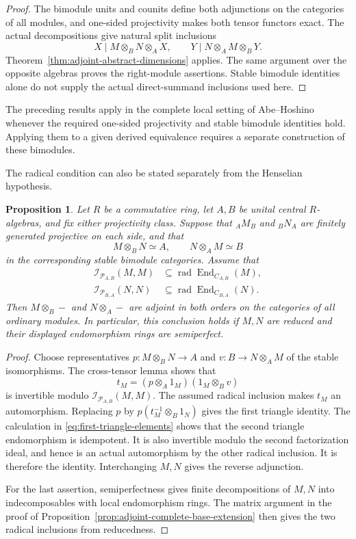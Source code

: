 \documentclass[12pt,a4paper,english,reqno]{amsart}
\numberwithin{equation}{section}
\theoremstyle{plain}
\newtheorem{proposition}[theorem]{Proposition}
\theoremstyle{definition}
\begin{document}
\begin{proof}
The bimodule units and counits define both adjunctions on the
categories of all modules, and one-sided projectivity makes both
tensor functors exact.  The actual decompositions give natural
split inclusions
\[
 X\mid M\otimes_BN\otimes_AX,
 \qquad Y\mid N\otimes_AM\otimes_BY.
\]
Theorem~\ref{thm:adjoint-abstract-dimensions} applies.  The same
argument over the opposite algebras proves the right-module
assertions.  Stable bimodule identities alone do not supply the
actual direct-summand inclusions used here.
\end{proof}

The preceding results apply in the complete local setting of
Abe--Hoshino \cite{AbeHoshino2007} whenever the required one-sided
projectivity and stable bimodule identities hold.  Applying them to
a given derived equivalence requires a separate construction of
these bimodules.

The radical condition can also be stated separately from the
Henselian hypothesis.

\begin{proposition}
\label{prop:adjoint-radical-criterion}
Let $R$ be a commutative ring, let $A,B$ be unital central
$R$-algebras, and fix either projectivity class.  Suppose that
${}_AM_B$ and ${}_BN_A$ are finitely generated projective on each
side, and that
\[
 M\otimes_BN\simeq A,\qquad N\otimes_AM\simeq B
\]
in the corresponding stable bimodule categories.  Assume that
\begin{align*}
 \mathcal I_{\mathcal P_{A,B}}(M,M)
 &\subseteq\operatorname{rad}\operatorname{End}_{C_{A,B}}(M),\\
 \mathcal I_{\mathcal P_{B,A}}(N,N)
 &\subseteq\operatorname{rad}\operatorname{End}_{C_{B,A}}(N).
\end{align*}
Then $M\otimes_B-$ and $N\otimes_A-$ are adjoint in both orders on
the categories of all ordinary modules.  In particular, this conclusion
holds if $M,N$ are reduced and their displayed endomorphism rings
are semiperfect.
\end{proposition}

\begin{proof}
Choose representatives $p:M\otimes_BN\to A$ and
$v:B\to N\otimes_AM$ of the stable isomorphisms.  The cross-tensor
lemma shows that
\[
 t_M=(p\otimes_A1_M)(1_M\otimes_Bv)
\]
is invertible modulo $\mathcal I_{\mathcal P_{A,B}}(M,M)$.
The assumed radical inclusion makes $t_M$ an automorphism.
Replacing $p$ by $p(t_M^{-1}\otimes_B1_N)$ gives the first triangle
identity.  The calculation in
\eqref{eq:first-triangle-elements} shows that the second triangle
endomorphism is idempotent.  It is also invertible modulo the
second factorization ideal, and hence is an actual automorphism
by the other radical inclusion.  It is therefore the identity.
Interchanging $M,N$ gives the reverse adjunction.

For the last assertion, semiperfectness gives finite decompositions
of $M,N$ into indecomposables with local endomorphism rings.
The matrix argument in the proof of
Proposition~\ref{prop:adjoint-complete-base-extension} then gives
the two radical inclusions from reducedness.
\end{proof}
\end{document}
